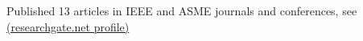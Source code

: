 \item Published 13 articles in IEEE and ASME journals and conferences, 
see \href{https://www.researchgate.net/profile/Kiron_Mateti}{(researchgate.net profile)} 